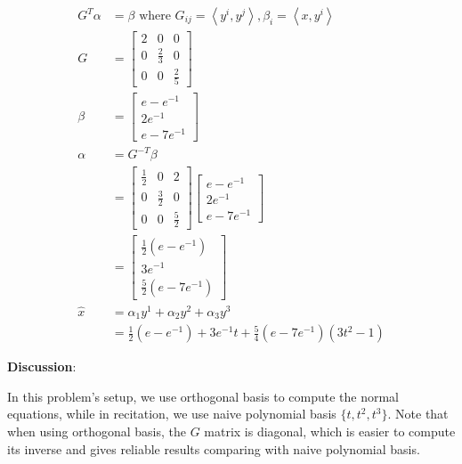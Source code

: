 \documentclass{article}
\theoremstyle{definition} %
\begin{document}
\begin{align*}
    G^{T} \alpha&=\beta \text { where } G_{i j}=\left\langle y^i, y^j\right\rangle, \beta_i =\left\langle x, y^i\right\rangle\\
    G&=\left[\begin{array}{ccc}
    2 & 0 & 0 \\
    0 & \frac{2}{3} & 0 \\
    0 & 0 & \frac{2}{5}
    \end{array}\right]\\
    \beta&=\left[\begin{array}{c}
    e-e^{-1} \\
    2 e^{-1} \\
    e-7 e^{-1}
    \end{array}\right]\\
    \alpha&=G^{-T} \beta\\
    &=\left[\begin{array}{ccc}
    \frac{1}{2} & 0 & 2 \\
    0 & \frac{3}{2} & 0 \\
    0 & 0 & \frac{5}{2}
    \end{array}\right]\left[\begin{array}{c}
    e-e^{-1} \\
    2 e^{-1} \\
    e-7 e^{-1}
    \end{array}\right]\\
    &=\left[\begin{array}{c}
    \frac{1}{2}\left(e-e^{-1}\right) \\
    3 e^{-1} \\
    \frac{5}{2}\left(e-7 e^{-1}\right)
    \end{array}\right]\\
    \hat{x}&= \alpha_1 y^1 + \alpha_2 y^2 +\alpha_3 y^3\\
    &=\frac{1}{2}\left(e-e^{-1}\right)+3 e^{-1} t+\frac{5}{4}\left(e-7 e^{-1}\right)\left(3 t^2-1\right)
\end{align*}

\textbf{Discussion}:

In this problem's setup, we use orthogonal basis to compute the normal equations, while in recitation, we use naive polynomial basis $\{ t, t^2, t^3\}$. Note that when using orthogonal basis, the $G$ matrix is diagonal, which is easier to compute its inverse and gives reliable results comparing with naive polynomial basis.
\end{document}
